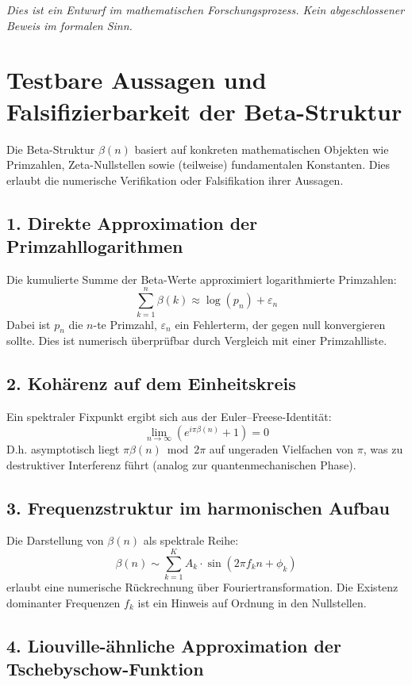 \documentclass[a4paper,12pt]{article}
\begin{document}
\vfill
\begin{center}
\textit{Dies ist ein Entwurf im mathematischen Forschungsprozess. Kein abgeschlossener Beweis im formalen Sinn.}

\section{Testbare Aussagen und Falsifizierbarkeit der Beta-Struktur}

Die Beta-Struktur $\beta(n)$ basiert auf konkreten mathematischen Objekten wie Primzahlen, Zeta-Nullstellen sowie (teilweise) fundamentalen Konstanten. Dies erlaubt die numerische Verifikation oder Falsifikation ihrer Aussagen.

\subsection*{1. Direkte Approximation der Primzahllogarithmen}

Die kumulierte Summe der Beta-Werte approximiert logarithmierte Primzahlen:
\[
\sum_{k=1}^{n} \beta(k) \approx \log(p_n) + \varepsilon_n
\]
Dabei ist $p_n$ die $n$-te Primzahl, $\varepsilon_n$ ein Fehlerterm, der gegen null konvergieren sollte. Dies ist numerisch überprüfbar durch Vergleich mit einer Primzahlliste.

\subsection*{2. Kohärenz auf dem Einheitskreis}

Ein spektraler Fixpunkt ergibt sich aus der Euler–Freese-Identität:
\[
\lim_{n \to \infty} \left(e^{i \pi \beta(n)} + 1\right) = 0
\]
D.h. asymptotisch liegt $\pi \beta(n) \bmod 2\pi$ auf ungeraden Vielfachen von $\pi$, was zu destruktiver Interferenz führt (analog zur quantenmechanischen Phase).

\subsection*{3. Frequenzstruktur im harmonischen Aufbau}

Die Darstellung von $\beta(n)$ als spektrale Reihe:
\[
\beta(n) \sim \sum_{k=1}^K A_k \cdot \sin(2\pi f_k n + \phi_k)
\]
erlaubt eine numerische Rückrechnung über Fouriertransformation. Die Existenz dominanter Frequenzen $f_k$ ist ein Hinweis auf Ordnung in den Nullstellen.

\subsection*{4. Liouville-ähnliche Approximation der Tschebyschow-Funktion}


\end{center}
\end{document}
